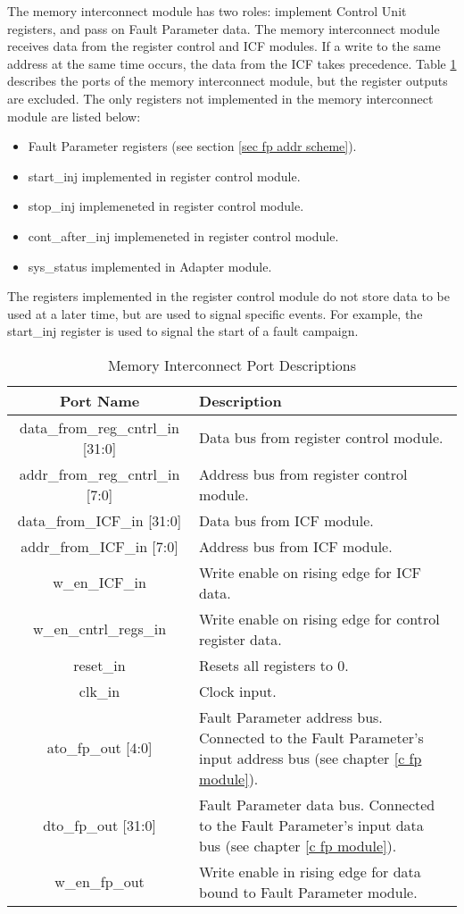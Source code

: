 \documentclass[]{report}
\begin{document}
The memory interconnect module has two roles: implement Control Unit registers, and pass on Fault Parameter data. The memory interconnect module receives data from the register control and ICF modules. If a write to the same address at the same time occurs, the data from the ICF takes precedence. Table \ref{table:mem inter port desc} describes the ports of the memory interconnect module, but the register outputs are excluded. The only registers not implemented in the memory interconnect module are listed below:
\begin{itemize}
	\item Fault Parameter registers (see section \ref{sec fp addr scheme}).
	\item start\_inj implemented in register control module.
	\item stop\_inj implemeneted in register control module.
	\item cont\_after\_inj implemeneted in register control module.
	\item sys\_status implemented in Adapter module.
\end{itemize}

The registers implemented in the register control module do not store data to be used at a later time, but are used to signal specific events. For example, the start\_inj register is used to signal the start of a fault campaign.

\begin{center}
	\begin{longtable}{|c|p{11cm}|}
		\caption{Memory Interconnect Port Descriptions}
		\label{table:mem inter port desc}\\
		\hline 
		Port Name & Description \\ 
		\hline 
		\endhead
		data\_from\_reg\_cntrl\_in [31:0] & Data bus from register control module. \\
		\hline
		addr\_from\_reg\_cntrl\_in [7:0] & Address bus from register control module.\\
		\hline
		data\_from\_ICF\_in [31:0] & Data bus from ICF module.\\
		\hline
		addr\_from\_ICF\_in [7:0] & Address bus from ICF module.\\
		\hline
		w\_en\_ICF\_in & Write enable on rising edge for ICF data.\\
		\hline
		w\_en\_cntrl\_regs\_in & Write enable on rising edge for control register data.\\
		\hline
		reset\_in & Resets all registers to 0.\\
		\hline
		clk\_in & Clock input.\\
		\hline
		ato\_fp\_out [4:0] & Fault Parameter address bus. Connected to the Fault Parameter's input address bus (see chapter \ref{c fp module}).\\ 
		\hline
		dto\_fp\_out [31:0] & Fault Parameter data bus. Connected to the Fault Parameter's input data bus (see chapter \ref{c fp module}).\\ 
		\hline
		w\_en\_fp\_out & Write enable in rising edge for data bound to Fault Parameter module.\\
		\hline
	\end{longtable} 
\end{center}
\end{document}
